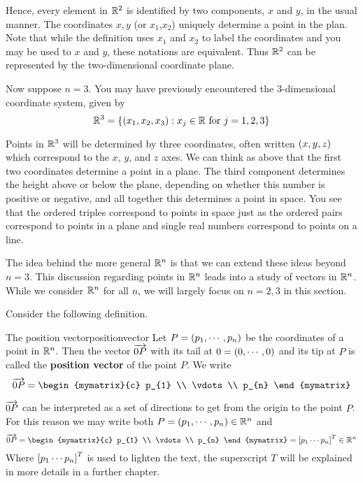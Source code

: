 Hence, every element in $\mathbb{R}^2$ is identified by two
components, $x$ and $y$, in the usual manner. The coordinates $x, y$ (or $x_1$,$x_2$) uniquely determine a point in the plan. Note that while the definition uses $x_1$ and $x_2$ to label the coordinates and you may be used to $x$ and $y$, these notations are equivalent. Thus $\mathbb{R}^2$ can be represented by the two-dimensional coordinate plane.

Now suppose $n=3$. You may have previously encountered the $3$-dimensional
coordinate system, given by
\begin{equation*}
\mathbb{R}^{3}=
\left\{\left(x_{1}, x_{2}, x_{3}\right)
:x_{j}\in \mathbb{R}\mbox{ for }j=1,2,3 \right\}
\end{equation*}

Points in $\mathbb{R}^3$ will be determined by three
coordinates, often written $\left(x,y,z\right)$ which correspond to the $x$, $y$,
and $z$ axes.  We can think as above that the first two coordinates
determine a point in a plane. The third component determines the
height above or below the plane, depending on whether this number is
positive or negative, and all together this determines a point in
space. You
see that the ordered triples correspond to points in space just as the
ordered pairs correspond to points in a plane and single real numbers
correspond to points on a line.

The idea behind the more general $\mathbb{R}^n$ is that we can extend
these ideas beyond $n = 3.$ This discussion regarding points in $\mathbb{R}^n$ leads into a study of vectors in $\mathbb{R}^n$. While we consider $\mathbb{R}^n$ for all $n$,
we will largely  focus on $n=2,3$ in this section. 

Consider the following definition.

\begin{definition}{The position vector}{positionvector}
Let $P=\left(p_{1},\cdots ,p_{n}\right) $ be the coordinates of a
point in $\mathbb{R}^{n}.$ Then the vector $\overrightarrow{0P}$ with its tail at
$0=\left(0,\cdots ,0\right) $ and its tip at 
$P$ is called the \textbf{position vector} of the point $P$. 
We write 
\begin{equation*}
\longvect{0P} = \begin{mymatrix}{c}
p_{1} \\
\vdots \\
p_{n}
\end{mymatrix}
\end{equation*}
\end{definition}

$\overrightarrow{0P}$ can be interpreted as a set of directions to get from the origin to the point $P$.
For this reason we may write both $P=\left(p_{1},\cdots ,p_{n}\right)  \in \mathbb{R}^{n}$
and  $$\longvect{0P}= \begin{mymatrix}{c}
p_{1} \\
\vdots \\
p_{n}
\end{mymatrix} = \mat{p_{1} \cdots p_{n} }^T \in \R^{n}$$ 
Where $\left[p_{1} \cdots p_{n} \right]^T$ is used to lighten the text, the superscript $T$ will be explained in more details in a further chapter.

